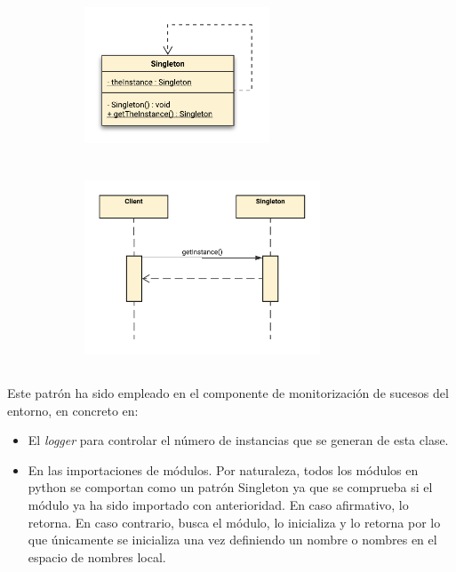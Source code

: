 \documentclass[12pt,a4paper, twoside]{report}
\begin{document}
	\begin{figure}[h]		
		\caption{Diagrama de clases y de secuencia del patrón de diseño creacional Singleton.}
 		\begin{subfigure}{0.5\textwidth}
 			\hbox{
 				\hspace{1cm}
 				\includegraphics[width=5.5cm, height=4.5cm]{Images/design/singleton_uml.png} 
 			}
		\end{subfigure}
		\begin{subfigure}{0.5\textwidth}
			\hbox{
 				\hspace{2cm}
				\includegraphics[width=7cm, height=6cm]{Images/design/singleton_secuencia}
			}
		\end{subfigure}
		\label{fig:design_singleton}
	\end{figure}
 	
	Este patrón ha sido empleado en el componente de monitorización de sucesos del entorno, en concreto en:

	\begin{itemize}
		\item El \textit{logger} para controlar el número de instancias que se generan de esta clase.
		\item En las importaciones de módulos. Por naturaleza, todos los módulos en \gls{python} se comportan como un patrón Singleton ya que se comprueba si el módulo ya ha sido importado con anterioridad. En caso afirmativo, lo retorna. En caso contrario, busca el módulo, lo inicializa y lo retorna por lo que únicamente se inicializa una vez definiendo un nombre o nombres en el espacio de nombres local.
	\end{itemize}
		
\end{document}
